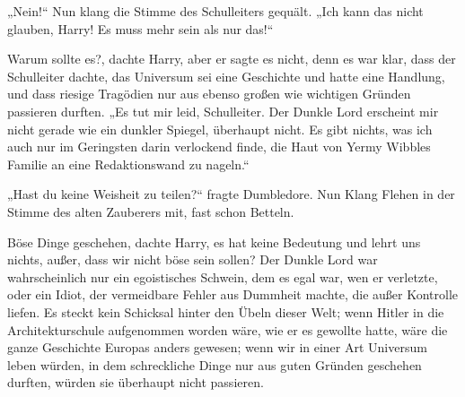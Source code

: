 „Nein!“ Nun klang die Stimme des Schulleiters gequält.
„Ich kann das nicht glauben, Harry! Es muss mehr sein als nur das!“

Warum sollte es?, dachte Harry, aber er sagte es nicht, denn es war klar, dass der Schulleiter dachte, das Universum sei eine Geschichte und hatte eine Handlung, und dass riesige Tragödien nur aus ebenso großen wie wichtigen Gründen passieren durften.
„Es tut mir leid, Schulleiter. Der Dunkle Lord erscheint mir nicht gerade wie ein dunkler Spiegel, überhaupt nicht. Es gibt nichts, was ich auch nur im Geringsten darin verlockend finde, die Haut von Yermy Wibbles Familie an eine Redaktionswand zu nageln.“

„Hast du keine Weisheit zu teilen?“ fragte Dumbledore. Nun Klang Flehen in der Stimme des alten Zauberers mit, fast schon Betteln.

Böse Dinge geschehen, dachte Harry, es hat keine Bedeutung und lehrt uns nichts, außer, dass wir nicht böse sein sollen? Der Dunkle Lord war wahrscheinlich nur ein egoistisches Schwein, dem es egal war, wen er verletzte, oder ein Idiot, der vermeidbare Fehler aus Dummheit machte, die außer Kontrolle liefen. Es steckt kein Schicksal hinter den Übeln dieser Welt; wenn Hitler in die Architekturschule aufgenommen worden wäre, wie er es gewollte hatte, wäre die ganze Geschichte Europas anders gewesen; wenn wir in einer Art Universum leben würden, in dem schreckliche Dinge nur aus guten Gründen geschehen durften, würden sie überhaupt nicht passieren.

